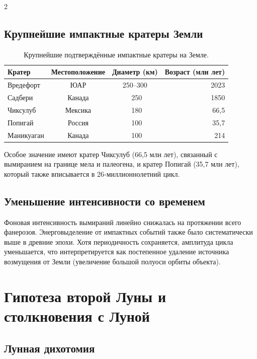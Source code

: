 \documentclass[11pt,a4paper]{article}
\begin{document}
\begin{multicols}{2}
		\subsection{Крупнейшие импактные кратеры Земли}
		
		\begin{table}[htbp]
			\centering
			\caption{Крупнейшие подтверждённые импактные кратеры на Земле.}
			\label{tab:craters}
			\footnotesize
			\begin{tabular}{lccr}
				\toprule
				\textbf{Кратер} & \textbf{Местоположение} & \textbf{Диаметр (км)} & \textbf{Возраст (млн лет)} \\
				\midrule
				Вредефорт & ЮАР & 250–300 & 2023 \\
				Садбери & Канада & ~250 & 1850 \\
				Чиксулуб & Мексика & ~180 & 66,5 \\
				Попигай & Россия & ~100 & 35,7 \\
				Маникуаган & Канада & ~100 & 214 \\
				\bottomrule
			\end{tabular}
		\end{table}
		
		Особое значение имеют кратер Чиксулуб (66,5 млн лет), связанный с вымиранием на границе мела и палеогена, и кратер Попигай (35,7 млн лет), который также вписывается в 26‑миллионнолетний цикл.
		
		\subsection{Уменьшение интенсивности со временем}
		
		Фоновая интенсивность вымираний линейно снижалась на протяжении всего фанерозоя. Энерговыделение от импактных событий также было систематически выше в древние эпохи. Хотя периодичность сохраняется, амплитуда цикла уменьшается, что интерпретируется как постепенное удаление источника возмущения от Земли (увеличение большой полуоси орбиты объекта).
		
		\section{Гипотеза второй Луны и столкновения с Луной}
		
		\subsection{Лунная дихотомия}
		

\end{multicols}
\end{document}
